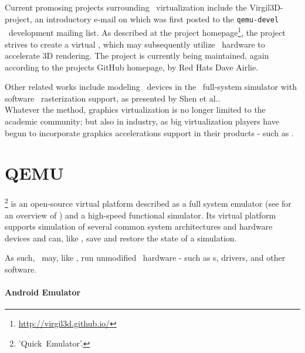 Current promosing projects surrounding \dvttermgpu\ virtualization include the Virgil3D-project, an introductory e-mail on which was first posted to the \texttt{qemu-devel} \dvttermqemu\ development mailing list.
As described at the project homepage\footnote{\url{http://virgil3d.github.io/}}, the project strives to create a virtual \dvttermgpu , which may subsequently utilize \dvttermhost\ hardware to accelerate 3D rendering.
The project is currently being maintained, again according to the projects GitHub homepage, by Red Hats Dave Airlie.

Other related works include modeling \dvttermgpu\ devices in the \dvttermqemu\ full-system simulator with software \dvttermopengles\ rasterization support, as presented by Shen et al..\\

\noindent
Whatever the method, graphics virtualization is no longer limited to the academic community; but also in industry, as big virtualization players have begun to incorporate graphics accelerations support in their products - such as \dvttermvmware {}.

\section{QEMU}
\label{sec:relatedwork_qemu}
\dvttermqemu \footnote{'Quick~Emulator'.} is an open-source virtual platform described as a full system emulator (see  for an overview of \dvttermqemu ) and a high-speed functional simulator.
Its virtual platform supports simulation of several common system architectures and hardware devices and can, like \dvttermsimics , save and restore the state of a simulation.

As such, \dvttermqemu\ may, like \dvttermsimics , run unmodified \dvttermtarget\ hardware - such as \dvttermos s, drivers, and other software.

\paragraph{Android Emulator}
\label{par:relatedwork_qemu_androidemulator}

